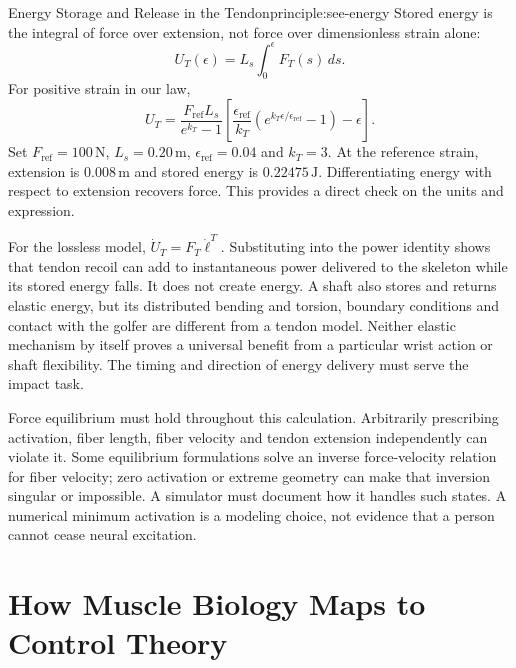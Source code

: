 \begin{principle}{Energy Storage and Release in the Tendon}{principle:see-energy}
Stored energy is the integral of force over extension, not force over dimensionless strain alone:
\[
U_T(\epsilon)=L_s\int_0^\epsilon F_T(s)\,ds.
\]
For positive strain in our law,
\[
U_T=\frac{F_{\mathrm{ref}}L_s}{e^{k_T}-1}
\left[\frac{\epsilon_{\mathrm{ref}}}{k_T}
\left(e^{k_T\epsilon/\epsilon_{\mathrm{ref}}}-1\right)-\epsilon\right].
\]
Set $F_{\mathrm{ref}}=100\,\mathrm{N}$, $L_s=0.20\,\mathrm{m}$, $\epsilon_{\mathrm{ref}}=0.04$ and $k_T=3$. At the reference strain, extension is $0.008\,\mathrm{m}$ and stored energy is $0.22475\,\mathrm{J}$. Differentiating energy with respect to extension recovers force. This provides a direct check on the units and expression.
\end{principle}

For the lossless model, $\dot U_T=F_T\dot\ell^T$. Substituting into the power identity shows that tendon recoil can add to instantaneous power delivered to the skeleton while its stored energy falls. It does not create energy. A shaft also stores and returns elastic energy, but its distributed bending and torsion, boundary conditions and contact with the golfer are different from a tendon model. Neither elastic mechanism by itself proves a universal benefit from a particular wrist action or shaft flexibility. The timing and direction of energy delivery must serve the impact task.

Force equilibrium must hold throughout this calculation. Arbitrarily prescribing activation, fiber length, fiber velocity and tendon extension independently can violate it. Some equilibrium formulations solve an inverse force-velocity relation for fiber velocity; zero activation or extreme geometry can make that inversion singular or impossible. A simulator must document how it handles such states. A numerical minimum activation is a modeling choice, not evidence that a person cannot cease neural excitation. \citep{millard2013flexing}

\section{How Muscle Biology Maps to Control Theory}

